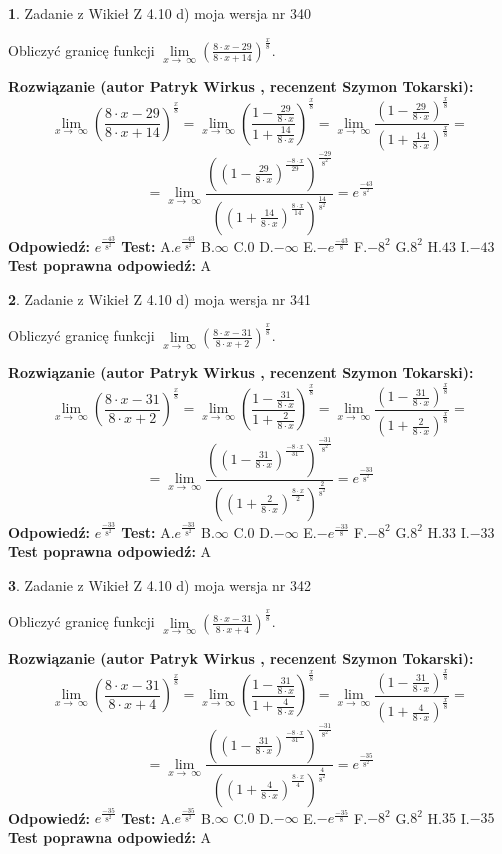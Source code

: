 \documentclass[12pt, a4paper]{article}
\theoremstyle{definition} %
\newtheorem{zad}{}
\newcommand{\zadStart}[1]{\begin{zad}#1\newline}
\newcommand{\zadStop}{\end{zad}}
\newcommand{\rozwStart}[2]{\noindent \textbf{Rozwiązanie (autor #1 , recenzent #2): }\newline}
\newcommand{\rozwStop}{\newline}
\newcommand{\odpStart}{\noindent \textbf{Odpowiedź:}\newline}
\newcommand{\odpStop}{\newline}
\newcommand{\testStart}{\noindent \textbf{Test:}\newline}
\newcommand{\testStop}{\newline}
\newcommand{\kluczStart}{\noindent \textbf{Test poprawna odpowiedź:}\newline}
\newcommand{\kluczStop}{\newline}
\begin{document}
\zadStart{Zadanie z Wikieł Z 4.10 d) moja wersja nr 340}


Obliczyć granicę funkcji  $\lim\limits_{x\to\ \infty}(\frac{8\cdot x-29}{8\cdot x+14})^{\frac{x}{8}}$.
\zadStop
\rozwStart{Patryk Wirkus}{Szymon Tokarski}
$$\lim\limits_{x\to\ \infty}(\frac{8\cdot x-29}{8\cdot x+14})^{\frac{x}{8}} = \lim\limits_{x\to\ \infty}(\frac{1-\frac{29}{8\cdot x}}{1+\frac{14}{8\cdot x}})^{\frac{x}{8}}=\lim\limits_{x\to\ \infty}\frac{(1-\frac{29}{8\cdot x})^{\frac{x}{8}}}{(1+\frac{14}{8\cdot x})^{\frac{x}{8}}}=$$
$$=\lim\limits_{x\to\ \infty}\frac{((1-\frac{29}{8\cdot x})^{\frac{-8\cdot x}{29}})^{\frac{-29}{8^{2}}}}{((1+\frac{14}{8\cdot x})^{\frac{8\cdot x}{14}})^{\frac{14}{8^{2}}}}=e^{\frac{-43}{8^{2}}}$$
\rozwStop
\odpStart
$e^{\frac{-43}{8^{2}}}$
\odpStop
\testStart
A.$e^{\frac{-43}{8^{2}}}$ B.$\infty$ C.$0$ D.$-\infty$ E.$-e^{\frac{-43}{8}}$
F.$-8^{2}$ G.$8^{2}$
H.$43$
I.$-43$
\testStop
\kluczStart
A
\kluczStop



\zadStart{Zadanie z Wikieł Z 4.10 d) moja wersja nr 341}


Obliczyć granicę funkcji  $\lim\limits_{x\to\ \infty}(\frac{8\cdot x-31}{8\cdot x+2})^{\frac{x}{8}}$.
\zadStop
\rozwStart{Patryk Wirkus}{Szymon Tokarski}
$$\lim\limits_{x\to\ \infty}(\frac{8\cdot x-31}{8\cdot x+2})^{\frac{x}{8}} = \lim\limits_{x\to\ \infty}(\frac{1-\frac{31}{8\cdot x}}{1+\frac{2}{8\cdot x}})^{\frac{x}{8}}=\lim\limits_{x\to\ \infty}\frac{(1-\frac{31}{8\cdot x})^{\frac{x}{8}}}{(1+\frac{2}{8\cdot x})^{\frac{x}{8}}}=$$
$$=\lim\limits_{x\to\ \infty}\frac{((1-\frac{31}{8\cdot x})^{\frac{-8\cdot x}{31}})^{\frac{-31}{8^{2}}}}{((1+\frac{2}{8\cdot x})^{\frac{8\cdot x}{2}})^{\frac{2}{8^{2}}}}=e^{\frac{-33}{8^{2}}}$$
\rozwStop
\odpStart
$e^{\frac{-33}{8^{2}}}$
\odpStop
\testStart
A.$e^{\frac{-33}{8^{2}}}$ B.$\infty$ C.$0$ D.$-\infty$ E.$-e^{\frac{-33}{8}}$
F.$-8^{2}$ G.$8^{2}$
H.$33$
I.$-33$
\testStop
\kluczStart
A
\kluczStop



\zadStart{Zadanie z Wikieł Z 4.10 d) moja wersja nr 342}


Obliczyć granicę funkcji  $\lim\limits_{x\to\ \infty}(\frac{8\cdot x-31}{8\cdot x+4})^{\frac{x}{8}}$.
\zadStop
\rozwStart{Patryk Wirkus}{Szymon Tokarski}
$$\lim\limits_{x\to\ \infty}(\frac{8\cdot x-31}{8\cdot x+4})^{\frac{x}{8}} = \lim\limits_{x\to\ \infty}(\frac{1-\frac{31}{8\cdot x}}{1+\frac{4}{8\cdot x}})^{\frac{x}{8}}=\lim\limits_{x\to\ \infty}\frac{(1-\frac{31}{8\cdot x})^{\frac{x}{8}}}{(1+\frac{4}{8\cdot x})^{\frac{x}{8}}}=$$
$$=\lim\limits_{x\to\ \infty}\frac{((1-\frac{31}{8\cdot x})^{\frac{-8\cdot x}{31}})^{\frac{-31}{8^{2}}}}{((1+\frac{4}{8\cdot x})^{\frac{8\cdot x}{4}})^{\frac{4}{8^{2}}}}=e^{\frac{-35}{8^{2}}}$$
\rozwStop
\odpStart
$e^{\frac{-35}{8^{2}}}$
\odpStop
\testStart
A.$e^{\frac{-35}{8^{2}}}$ B.$\infty$ C.$0$ D.$-\infty$ E.$-e^{\frac{-35}{8}}$
F.$-8^{2}$ G.$8^{2}$
H.$35$
I.$-35$
\testStop
\kluczStart
A
\kluczStop
\end{document}
